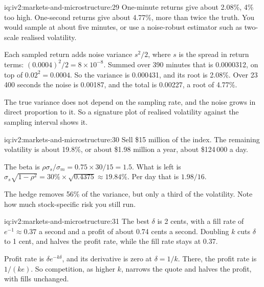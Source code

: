 \begin{solution}{iq:iv2:markets-and-microstructure:29}
One-minute returns give about 2.08\%, 4\% too high. One-second returns give about 4.77\%, more than twice the truth. You would sample at about five minutes, or use a noise-robust estimator such as two-scale realised volatility.

Each sampled return adds noise variance $s^2/2$, where $s$ is the spread in return terms: $(0.0004)^2/2 = 8 \times 10^{-8}$. Summed over 390 minutes that is 0.0000312, on top of $0.02^2 = 0.0004$. So the variance is 0.000431, and its root is 2.08\%. Over 23\,400 seconds the noise is 0.00187, and the total is 0.00227, a root of 4.77\%.

The true variance does not depend on the sampling rate, and the noise grows in direct proportion to it. So a signature plot of realised volatility against the sampling interval shows it.

\end{solution}

\begin{solution}{iq:iv2:markets-and-microstructure:30}
Sell \$15 million of the index. The remaining volatility is about 19.8\%, or about \$1.98 million a year, about \$124\,000 a day.

The beta is $\rho\sigma_s/\sigma_m = 0.75 \times 30/15 = 1.5$. What is left is $\sigma_s\sqrt{1 - \rho^2} = 30\% \times \sqrt{0.4375} \approx 19.84\%$. Per day that is $1.98/16$.

The hedge removes 56\% of the variance, but only a third of the volatility. Note how much stock-specific risk you still run.

\end{solution}

\begin{solution}{iq:iv2:markets-and-microstructure:31}
The best $\delta$ is 2 cents, with a fill rate of $e^{-1} \approx 0.37$ a second and a profit of about 0.74 cents a second. Doubling $k$ cuts $\delta$ to 1 cent, and halves the profit rate, while the fill rate stays at 0.37.

Profit rate is $\delta e^{-k\delta}$, and its derivative is zero at $\delta = 1/k$. There, the profit rate is $1/(ke)$. So competition, as higher $k$, narrows the quote and halves the profit, with fills unchanged.

\end{solution}

